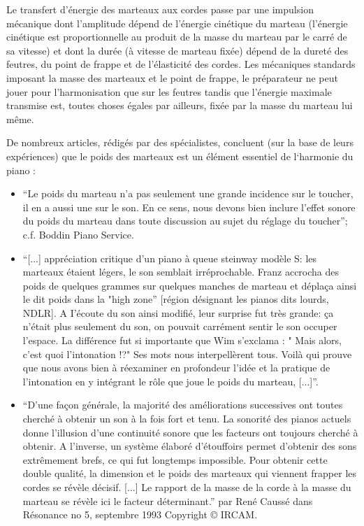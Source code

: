 \documentclass[french,a4paper,12pt]{report}
\begin{document}
Le transfert d’énergie des marteaux aux cordes passe par une impulsion mécanique dont l’amplitude dépend de l’énergie cinétique du marteau (l’énergie cinétique est proportionnelle au produit de la masse du marteau par le carré de sa vitesse) et dont la durée (à vitesse de marteau fixée) dépend de la dureté des feutres, du point de frappe et de l’élasticité des cordes. Les mécaniques standards imposant la masse des marteaux et le point de frappe, le préparateur ne peut jouer pour l’harmonisation que sur les feutres tandis que l’énergie maximale transmise est, toutes choses égales par ailleurs, fixée par la masse du marteau lui même.

De nombreux articles, rédigés par des spécialistes, concluent (sur la base de leurs expériences) que le poids des marteaux est un élément essentiel de l‘harmonie du piano :

\begin{itemize}
	\item  “Le poids du marteau n'a pas seulement une grande incidence sur le toucher, il en a aussi une sur le son. En ce sens, nous devons bien inclure l'effet sonore du poids du marteau dans toute discussion au sujet du réglage du toucher”; c.f. Boddin Piano Service.

	\item  “[...] appréciation critique d'un piano à queue steinway modèle S: les marteaux étaient légers, le son semblait irréprochable. Franz accrocha des poids de quelques grammes sur quelques manches de marteau et déplaça ainsi le dit poids dans la "high zone” [région désignant les pianos dits lourds, NDLR]. A I'écoute du son ainsi modifié, leur surprise fut
très grande: ça n'était plus seulement du son, on pouvait carrément sentir le son occuper l'espace. La différence fut si importante que Wim s'exclama : " Mais alors, c'est quoi l'intonation !?" Ses mots nous interpellèrent tous. Voilà qui prouve que nous avons bien à réexaminer en profondeur l'idée et la pratique de l'intonation en y intégrant le rôle que
joue le poids du marteau, [...]”.

	\item  “D'une façon générale, la majorité des améliorations successives ont toutes cherché à obtenir un son à la fois fort et tenu. La sonorité des pianos actuels donne l'illusion d'une continuité sonore que les facteurs ont toujours cherché à obtenir. A l'inverse, un système élaboré d'étouffoirs permet d'obtenir des sons extrêmement brefs, ce qui fut longtemps impossible. Pour obtenir cette double qualité, la dimension et le poids des marteaux qui viennent frapper les cordes se révèle décisif. [...] Le rapport de la masse de la corde à la masse du marteau se révèle ici le facteur déterminant.” par René Caussé dans Résonance no 5, septembre 1993 Copyright © IRCAM.

\end{itemize}
\end{document}
